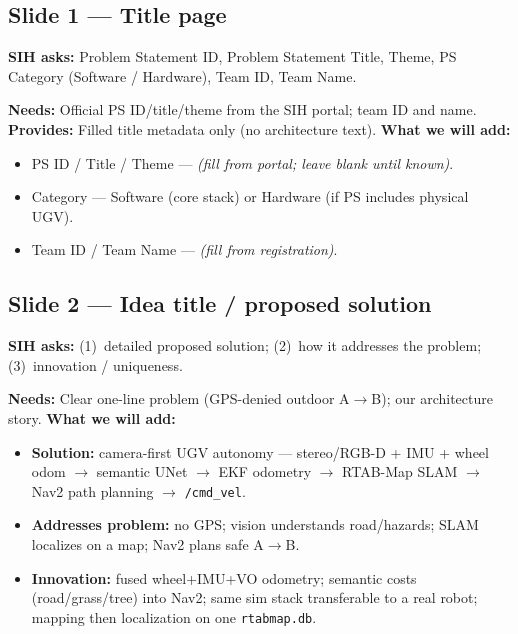 \documentclass[11pt,a4paper]{article}
\newcommand{\needs}[1]{\textbf{Needs:} #1}
\newcommand{\provides}[1]{\textbf{Provides:} #1}
\begin{document}
\subsection{Slide 1 --- Title page}

\textbf{SIH asks:} Problem Statement ID, Problem Statement Title, Theme,
PS Category (Software / Hardware), Team ID, Team Name.

\needs{Official PS ID/title/theme from the SIH portal; team ID and name.}
\provides{Filled title metadata only (no architecture text).}
\textbf{What we will add:}
\begin{itemize}[nosep,leftmargin=*]
  \item PS ID / Title / Theme --- \emph{(fill from portal; leave blank until known)}.
  \item Category --- Software (core stack) or Hardware (if PS includes physical UGV).
  \item Team ID / Team Name --- \emph{(fill from registration)}.
\end{itemize}

\subsection{Slide 2 --- Idea title / proposed solution}

\textbf{SIH asks:}
(1)~detailed proposed solution;
(2)~how it addresses the problem;
(3)~innovation / uniqueness.

\needs{Clear one-line problem (GPS-denied outdoor A$\rightarrow$B); our architecture story.}
\textbf{What we will add:}
\begin{itemize}[nosep,leftmargin=*]
  \item \textbf{Solution:} camera-first UGV autonomy --- stereo/RGB-D + IMU + wheel odom
        $\rightarrow$ semantic UNet $\rightarrow$ EKF odometry $\rightarrow$ RTAB-Map SLAM
        $\rightarrow$ Nav2 path planning $\rightarrow$ \texttt{/cmd\_vel}.
  \item \textbf{Addresses problem:} no GPS; vision understands road/hazards; SLAM localizes
        on a map; Nav2 plans safe A$\rightarrow$B.
  \item \textbf{Innovation:} fused wheel+IMU+VO odometry; semantic costs (road/grass/tree)
        into Nav2; same sim stack transferable to a real robot; mapping then localization
        on one \texttt{rtabmap.db}.
\end{itemize}
\end{document}
